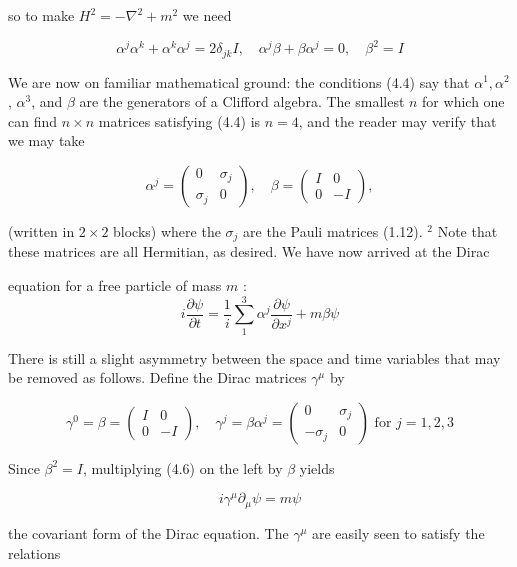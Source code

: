 \documentclass[10pt, letterpaper]{article}
\begin{document}
so to make $H^{2}=-\nabla^{2}+m^{2}$ we need

$$
\alpha^{j} \alpha^{k}+\alpha^{k} \alpha^{j}=2 \delta_{j k} I, \quad \alpha^{j} \beta+\beta \alpha^{j}=0, \quad \beta^{2}=I
$$

We are now on familiar mathematical ground: the conditions (4.4) say that $\alpha^{1}, \alpha^{2}$, $\alpha^{3}$, and $\beta$ are the generators of a Clifford algebra. The smallest $n$ for which one can find $n \times n$ matrices satisfying (4.4) is $n=4$, and the reader may verify that we may take

$$
\alpha^{j}=\left(\begin{array}{cc}
0 & \sigma_{j} \\
\sigma_{j} & 0
\end{array}\right), \quad \beta=\left(\begin{array}{cc}
I & 0 \\
0 & -I
\end{array}\right),
$$

(written in $2 \times 2$ blocks) where the $\sigma_{j}$ are the Pauli matrices (1.12). ${ }^{2}$ Note that these matrices are all Hermitian, as desired. We have now arrived at the Dirac

equation for a free particle of mass $m$ :
$$
i \frac{\partial \psi}{\partial t}=\frac{1}{i} \sum_{1}^{3} \alpha^{j} \frac{\partial \psi}{\partial x^{j}}+m \beta \psi
$$

There is still a slight asymmetry between the space and time variables that may be removed as follows. Define the Dirac matrices $\gamma^{\mu}$ by

$$
\gamma^{0}=\beta=\left(\begin{array}{cc}
I & 0 \\
0 & -I
\end{array}\right), \quad \gamma^{j}=\beta \alpha^{j}=\left(\begin{array}{cc}
0 & \sigma_{j} \\
-\sigma_{j} & 0
\end{array}\right) \text { for } j=1,2,3
$$

Since $\beta^{2}=I$, multiplying (4.6) on the left by $\beta$ yields

$$
i \gamma^{\mu} \partial_{\mu} \psi=m \psi
$$

the covariant form of the Dirac equation. The $\gamma^{\mu}$ are easily seen to satisfy the relations
\end{document}
